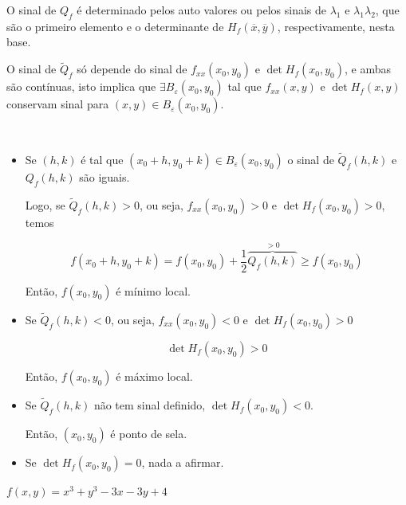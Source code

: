 \documentclass{book}
\begin{document}
O sinal de $Q_f$ \'e determinado pelos auto valores ou pelos sinais de $\lambda_1$ e $\lambda_1\lambda_2$, que s\~ao o primeiro elemento e o determinante de $H_f \left( {\overline x ,\overline y } \right)$, respectivamente, nesta base.

O sinal de $\widetilde Q_f$ s\'o depende do sinal de $f_{xx} \left( {x_0 ,y_0 } \right)$ e $\det H_f \left( {x_0 ,y_0 } \right)$, e ambas s\~ao cont\'inuas, isto implica que $\exists B_\varepsilon  \left( {x_0 ,y_0 } \right)$ tal que $f_{xx} \left( {x,y} \right)$ e $\det H_f \left( {x,y} \right)$ conservam sinal para $\left( {x,y} \right) \in B_\varepsilon  \left( {x_0 ,y_0 } \right)$.

\

\begin{itemize}
  \item Se $\left( {h,k} \right)$ \'e tal que $\left( {x_0  + h,y_0  + k} \right) \in B_\varepsilon  \left( {x_0 ,y_0 } \right)$ o sinal de $\widetilde Q_f \left( {h,k} \right)$ e $Q_f \left( {h,k} \right)$ s\~ao iguais.

      Logo, se $\widetilde Q_f \left( {h,k} \right) > 0$, ou seja, $f_{xx} \left( {x_0 ,y_0 } \right) > 0$ e $\det H_f \left( {x_0 ,y_0 } \right) > 0$, temos

\[
        f\left( {x_0  + h,y_0  + k} \right) = f\left( {x_0 ,y_0 } \right) + \frac{1}{2}\overbrace {Q_f \left( {h,k} \right)}^{ > 0} \geqslant f\left( {x_0 ,y_0 } \right)
\]

Ent\~ao, $f\left( {x_0 ,y_0 } \right)$ \'e m\'inimo local.

  \item Se $\widetilde Q_f \left( {h,k} \right) < 0$, ou seja, $f_{xx} \left( {x_0 ,y_0 } \right) < 0$ e $\det H_f \left( {x_0 ,y_0 } \right) > 0$

\[
\det H_f \left( {x_0 ,y_0 } \right) > 0
\]

Ent\~ao, $f\left( {x_0 ,y_0 } \right)$ \'e m\'aximo local.

  \item Se $\widetilde Q_f \left( {h,k} \right)$ n\~ao tem sinal definido, $\det H_f \left( {x_0 ,y_0 } \right) < 0$.

Ent\~ao, $\left( {x_0 ,y_0 } \right)$ \'e ponto de sela.
\item Se $\det H_f \left( {x_0 ,y_0 } \right) = 0$, nada a afirmar.
\end{itemize}

\begin{ex}
$f\left( {x,y} \right) = x^3  + y^3  - 3x - 3y + 4$
\end{ex}
\end{document}
